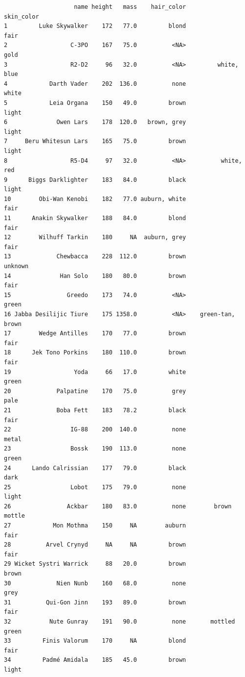 \documentclass[
]{article}
\begin{document}
\begin{verbatim}
                    name height   mass    hair_color          skin_color
1         Luke Skywalker    172   77.0         blond                fair
2                  C-3PO    167   75.0          <NA>                gold
3                  R2-D2     96   32.0          <NA>         white, blue
4            Darth Vader    202  136.0          none               white
5            Leia Organa    150   49.0         brown               light
6              Owen Lars    178  120.0   brown, grey               light
7     Beru Whitesun Lars    165   75.0         brown               light
8                  R5-D4     97   32.0          <NA>          white, red
9      Biggs Darklighter    183   84.0         black               light
10        Obi-Wan Kenobi    182   77.0 auburn, white                fair
11      Anakin Skywalker    188   84.0         blond                fair
12        Wilhuff Tarkin    180     NA  auburn, grey                fair
13             Chewbacca    228  112.0         brown             unknown
14              Han Solo    180   80.0         brown                fair
15                Greedo    173   74.0          <NA>               green
16 Jabba Desilijic Tiure    175 1358.0          <NA>    green-tan, brown
17        Wedge Antilles    170   77.0         brown                fair
18      Jek Tono Porkins    180  110.0         brown                fair
19                  Yoda     66   17.0         white               green
20             Palpatine    170   75.0          grey                pale
21             Boba Fett    183   78.2         black                fair
22                 IG-88    200  140.0          none               metal
23                 Bossk    190  113.0          none               green
24      Lando Calrissian    177   79.0         black                dark
25                 Lobot    175   79.0          none               light
26                Ackbar    180   83.0          none        brown mottle
27            Mon Mothma    150     NA        auburn                fair
28          Arvel Crynyd     NA     NA         brown                fair
29 Wicket Systri Warrick     88   20.0         brown               brown
30             Nien Nunb    160   68.0          none                grey
31          Qui-Gon Jinn    193   89.0         brown                fair
32           Nute Gunray    191   90.0          none       mottled green
33         Finis Valorum    170     NA         blond                fair
34         Padmé Amidala    185   45.0         brown               light

\end{verbatim}
\end{document}
